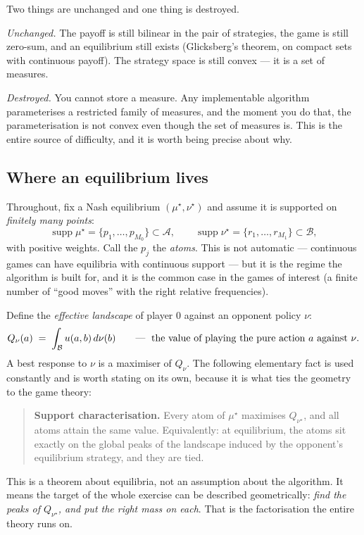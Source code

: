 \documentclass[11pt]{article}
\theoremstyle{definition}
\newcommand{\cA}{\mathcal{A}}
\newcommand{\cB}{\mathcal{B}}
\DeclareMathOperator{\supp}{supp}
\begin{document}
Two things are unchanged and one thing is destroyed.

\emph{Unchanged.} The payoff is still bilinear in the pair of strategies, the
game is still zero-sum, and an equilibrium still exists (Glicksberg's theorem, on
compact sets with continuous payoff). The strategy space is still convex --- it
is a set of measures.

\emph{Destroyed.} You cannot store a measure. Any implementable algorithm
parameterises a restricted family of measures, and the moment you do that, the
parameterisation is not convex even though the set of measures is. This is the
entire source of difficulty, and it is worth being precise about why.

\subsection*{Where an equilibrium lives}

Throughout, fix a Nash equilibrium $(\mu^\star,\nu^\star)$ and assume it is
supported on \emph{finitely many points}:
\[
  \supp \mu^\star = \{p_1,\dots,p_{M_0}\} \subset \cA,
  \qquad
  \supp \nu^\star = \{r_1,\dots,r_{M_1}\} \subset \cB,
\]
with positive weights. Call the $p_j$ the \emph{atoms}. This is not automatic ---
continuous games can have equilibria with continuous support --- but it is the
regime the algorithm is built for, and it is the common case in the games of
interest (a finite number of ``good moves'' with the right relative frequencies).

Define the \emph{effective landscape} of player $0$ against an opponent policy
$\nu$:
\begin{equation}\label{eq:landscape}
  Q_\nu(a) \;=\; \int_\cB u(a,b)\,d\nu(b)
  \qquad\text{---\; the value of playing the pure action $a$ against $\nu$.}
\end{equation}
A best response to $\nu$ is a maximiser of $Q_\nu$. The following elementary fact
is used constantly and is worth stating on its own, because it is what ties the
geometry to the game theory:

\begin{quote}
\textbf{Support characterisation.} Every atom of $\mu^\star$ maximises
$Q_{\nu^\star}$, and all atoms attain the same value. Equivalently: at
equilibrium, the atoms sit exactly on the global peaks of the landscape induced
by the opponent's equilibrium strategy, and they are tied.
\end{quote}

\noindent
This is a theorem about equilibria, not an assumption about the algorithm. It
means the target of the whole exercise can be described geometrically: \emph{find
the peaks of $Q_{\nu^\star}$, and put the right mass on each}. That is the
factorisation the entire theory runs on.
\end{document}
